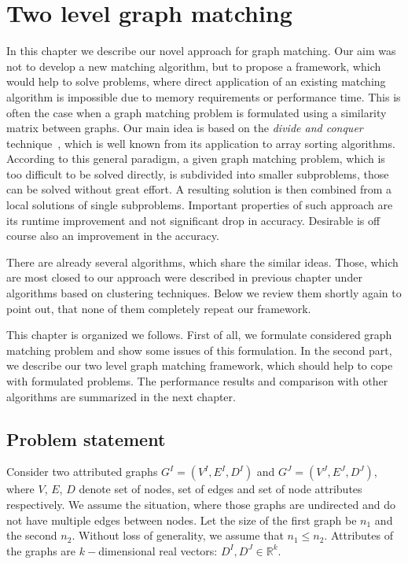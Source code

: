 \chapter{Two level graph matching} \label{chapter:2levelGM}
In this chapter we describe our novel approach for graph matching. Our aim was not to develop a new matching algorithm, but to propose a framework, which would help to solve problems, where direct application of an existing matching algorithm is impossible due to memory requirements or performance time. This is often the case when a graph matching problem is formulated using a similarity matrix between graphs. Our main idea is based on the  \emph{divide and conquer} technique~\cite{Cormen}, which is well known from its application to array sorting algorithms. According to this general paradigm, a given graph matching problem, which is too difficult to be solved directly, is subdivided into smaller subproblems, those can be solved without great effort. A resulting solution is then combined from a local solutions of single subproblems. Important properties of such approach are its runtime improvement and not significant drop in accuracy. Desirable is off course also an improvement in the accuracy.

There are already several algorithms, which share the similar ideas. Those, which are most closed to our approach were described in previous chapter under algorithms based on clustering techniques. Below we review them shortly again to point out, that none of them completely repeat our framework.

This chapter is organized we follows. First of all, we formulate considered graph matching problem and show some issues of this formulation. In the second part, we describe our two level graph matching framework, which should help to cope with formulated problems. The performance results and comparison with other algorithms are summarized in the next chapter. 
\section{Problem statement} \label{sec:prob_stat}
Consider two attributed graphs $G^I = (V^I, E^I, D^I)$ and $G^J = (V^J, E^J, D^J)$, where $V$, $E$, $D$ denote set of nodes, set of edges and set of node attributes respectively. We assume the situation, where those graphs are undirected and do not have multiple edges between nodes. Let the size of the first graph be $n_1$ and the second $n_2$. Without loss of generality, we assume that $n_1\le n_2$. Attributes of the graphs are $k-$dimensional real vectors: $D^I,D^J\in\mathbb{R}^k$.

